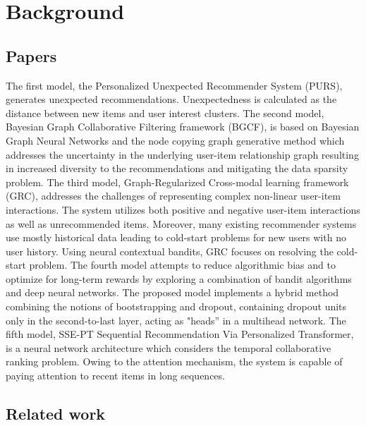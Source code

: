 \chapter{Background}
\section{Papers}
The first model, the Personalized Unexpected Recommender System (PURS), generates unexpected recommendations.  Unexpectedness is calculated as the distance between new items and user interest clusters. The second model, Bayesian Graph Collaborative Filtering framework (BGCF), is based on Bayesian Graph Neural Networks and the node copying graph generative method which addresses the uncertainty in the underlying user-item relationship graph resulting in increased diversity to the recommendations and mitigating the data sparsity problem. The third model, Graph-Regularized Cross-modal learning framework (GRC), addresses the challenges of representing complex non-linear user-item interactions. The system utilizes both positive and negative user-item interactions as well as unrecommended items. Moreover, many existing recommender systems use mostly historical data leading to cold-start problems for new users with no user history. Using neural contextual bandits, GRC focuses on resolving the cold-start problem. The fourth model attempts to reduce algorithmic bias and to optimize for long-term rewards by exploring a combination of bandit algorithms and deep neural networks. The proposed model implements a hybrid method combining the notions of bootstrapping and dropout, containing dropout units only in the second-to-last layer, acting as "heads” in a multihead network.
The fifth model, SSE-PT Sequential Recommendation Via Personalized Transformer, is a neural network architecture which considers the temporal collaborative ranking problem. Owing to the attention mechanism, the system is capable of paying attention to recent items in long sequences.

\section{Related work}

